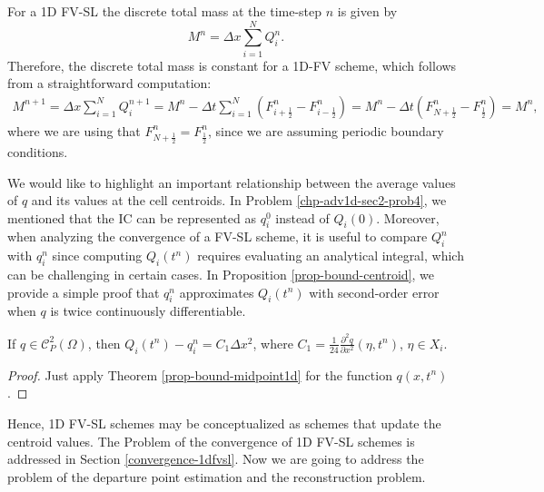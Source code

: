 For a 1D FV-SL the discrete total mass at the time-step $n$ is given by
\begin{equation}
	\label{1d-fv-mass}
	M^n =  \Delta x \sum_{i=1}^N Q_i^n.
\end{equation}
Therefore, the discrete total mass is constant for a 1D-FV scheme,
which follows from a straightforward computation:
\begin{align*}
	M^{n+1} =  \Delta x \sum_{i=1}^N Q_i^{n+1}
					= M^{n} - \Delta t  \sum_{i=1}^N (F^n_{i+\frac{1}{2}}- F^n_{i-\frac{1}{2}})
					= M^{n} - \Delta t (F^n_{N+\frac{1}{2}}- F^n_{\frac{1}{2}})
					= M^{n},
\end{align*}
where we are using that $F^n_{N+\frac{1}{2}} = F^n_{\frac{1}{2}}$, since we are assuming periodic boundary
conditions.

We would like to highlight an important relationship between the average values of $q$ and
its values at the cell centroids. In Problem \ref{chp-adv1d-sec2-prob4}, we mentioned that 
the IC can be represented as $q_i^0$ instead of $Q_i(0)$.
Moreover, when analyzing the convergence of a FV-SL scheme, it is useful
to compare $Q_i^n$ with $q_i^n$ since computing $Q_i(t^n)$ requires evaluating an analytical
integral, which can be challenging in certain cases. In Proposition \ref{prop-bound-centroid},
we provide a simple proof that $q_i^n$ approximates $Q_i(t^n)$ with second-order error
when $q$ is twice continuously differentiable.
\begin{prop}
	\label{prop-bound-centroid}
	If $q \in \mathcal{C}^2_P(\Omega)$, then $Q_i(t^n)-q_i^n = C_1 \Delta x^2$, where 
	$C_1 = \frac{1}{24}\frac{\partial^2 q}{\partial x^2} (\eta, t^n)$,  $\eta \in X_i$.
\end{prop}
\begin{proof}
	Just apply Theorem \ref{prop-bound-midpoint1d} for the function $q(x,t^n)$.	
\end{proof}
Hence, 1D FV-SL schemes may be conceptualized as schemes that update the centroid values.
The Problem of the convergence of 1D FV-SL schemes is addressed in Section \ref{convergence-1dfvsl}.
Now we are going to address the problem of the departure point estimation and the reconstruction problem.

